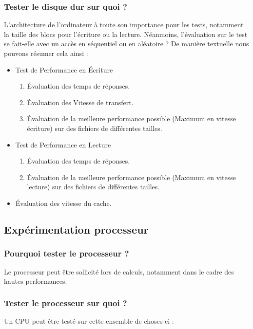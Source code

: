\subsubsection{Tester le disque dur sur quoi ?}
L'architecture de l'ordinateur à toute son importance pour les tests, notamment la taille des blocs pour l'écriture ou la lecture. Néanmoins, l'évaluation sur le test se fait-elle avec un accès en séquentiel ou en aléatoire ? De manière textuelle nous pouvons résumer cela ainsi : 
\begin{itemize}
\item Test de Performance en Écriture 
		\begin{enumerate}
		\item Évaluation des temps de réponses. 
		\item Évaluation des Vitesse de transfert.
		\item Évaluation de la meilleure performance possible (Maximum en vitesse écriture) sur des fichiers de différentes tailles.
		\end{enumerate}
\item Test de Performance en Lecture 
		\begin{enumerate}
		\item Évaluation des temps de réponses. 
		\item Évaluation de la meilleure performance possible (Maximum en vitesse lecture) sur des fichiers de différentes tailles. 
		\end{enumerate}
\item Évaluation des vitesse du cache.
\end{itemize}
\subsection{Expérimentation processeur}

\subsubsection{Pourquoi tester le processeur ? }
Le processeur peut être sollicité lors de calculs, notamment dans le cadre des hautes performances.
\subsubsection{Tester le processeur sur quoi ?  }
Un CPU peut être testé sur cette ensemble de choses-ci : 

